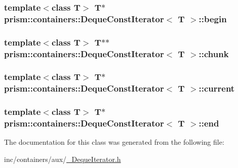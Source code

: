 \subsubsection[{\texorpdfstring{begin}{begin}}]{\setlength{\rightskip}{0pt plus 5cm}template$<$class T$>$ T$\ast$ {\bf prism\+::containers\+::\+Deque\+Const\+Iterator}$<$ T $>$\+::begin}\hypertarget{classprism_1_1containers_1_1_deque_const_iterator_abf83c5c7579d2afbcbd22b8d5ef2edc2}{}\label{classprism_1_1containers_1_1_deque_const_iterator_abf83c5c7579d2afbcbd22b8d5ef2edc2}
\subsubsection[{\texorpdfstring{chunk}{chunk}}]{\setlength{\rightskip}{0pt plus 5cm}template$<$class T$>$ T$\ast$$\ast$ {\bf prism\+::containers\+::\+Deque\+Const\+Iterator}$<$ T $>$\+::chunk}\hypertarget{classprism_1_1containers_1_1_deque_const_iterator_ab19c11f010bf5e86d3ecfe592ed37e13}{}\label{classprism_1_1containers_1_1_deque_const_iterator_ab19c11f010bf5e86d3ecfe592ed37e13}
\subsubsection[{\texorpdfstring{current}{current}}]{\setlength{\rightskip}{0pt plus 5cm}template$<$class T$>$ T$\ast$ {\bf prism\+::containers\+::\+Deque\+Const\+Iterator}$<$ T $>$\+::current}\hypertarget{classprism_1_1containers_1_1_deque_const_iterator_a79a6700a8d6b8ed6c6cd82f5a0692326}{}\label{classprism_1_1containers_1_1_deque_const_iterator_a79a6700a8d6b8ed6c6cd82f5a0692326}
\subsubsection[{\texorpdfstring{end}{end}}]{\setlength{\rightskip}{0pt plus 5cm}template$<$class T$>$ T$\ast$ {\bf prism\+::containers\+::\+Deque\+Const\+Iterator}$<$ T $>$\+::end}\hypertarget{classprism_1_1containers_1_1_deque_const_iterator_adffe96c78471c991f65b5bacdee164a0}{}\label{classprism_1_1containers_1_1_deque_const_iterator_adffe96c78471c991f65b5bacdee164a0}


The documentation for this class was generated from the following file\+:\begin{DoxyCompactItemize}
\item 
inc/containers/aux/\hyperlink{___deque_iterator_8h}{\+\_\+\+Deque\+Iterator.\+h}\end{DoxyCompactItemize}
